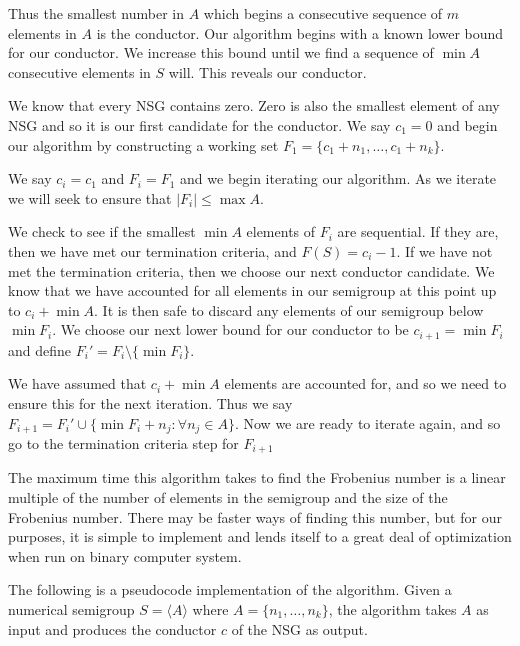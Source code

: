 \documentclass[11pt]{amsart}
\theoremstyle{plain}
\theoremstyle{definition}
\begin{document}
Thus the smallest number in $A$ which begins a consecutive sequence of $m$ elements in $A$ is the conductor.
Our algorithm begins with a known lower bound for our conductor.
We increase this bound until we find a sequence of $\min A$ consecutive elements in $S$ will. This reveals our conductor.

We know that every NSG contains zero.
Zero is also the smallest element of any NSG and so it is our first candidate for the conductor.
We say $c_1=0$ and begin our algorithm by constructing a working set $F_1=\{c_1+n_1,\dots, c_1+n_k\}$.

We say $c_i=c_1$ and $F_i=F_1$ and we begin iterating our algorithm.
As we iterate we will seek to ensure that $|F_i|\le \max A$.

We check to see if the smallest $\min A$ elements of $F_i$ are sequential.
If they are, then we have met our termination criteria, and $F(S)=c_i-1$.
If we have not met the termination criteria, then we choose our next conductor candidate.
We know that we have accounted for all elements in our semigroup at this point up to $c_i+\min A$.
It is then safe to discard any elements of our semigroup below $\min F_i$.
We choose our next lower bound for our conductor to be $c_{i+1}=\min F_i$ and define $F_i'=F_i\setminus\{\min F_i\}$.

We have assumed that $c_i+\min A$ elements are accounted for, and so we need to ensure this for the next iteration.
Thus we say $F_{i+1}=F_i'\cup \{\min F_i+n_j:\forall n_j\in A\}$. Now we are ready to iterate again, and so go to the termination criteria step for $F_{i+1}$

The maximum time this algorithm takes to find the Frobenius number is a linear
multiple of the number of elements in the semigroup and the size of the
Frobenius number. There may be faster ways of finding this number, but for our
purposes, it is simple to implement and lends itself to a great deal of optimization when run on binary computer system.\cite{frobmask}

The following is a pseudocode implementation of the algorithm. Given a numerical semigroup $S=\langle A\rangle$ where $A=\{n_1,\dots,n_k\}$, the algorithm takes $A$ as input and produces the conductor $c$ of the NSG as output.
\end{document}
